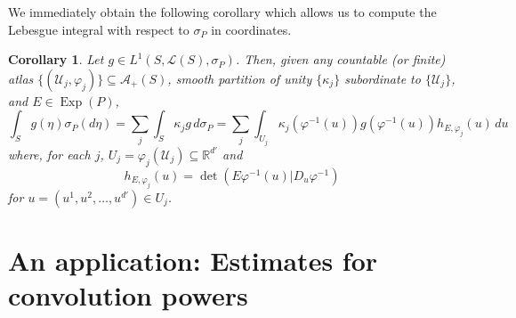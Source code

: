 \documentclass[11pt]{article}
\newtheorem{corollary}[theorem]{Corollary}
\newcommand\Exp{\operatorname{Exp}}
\renewcommand\det{\operatorname{det}}
\begin{document}
\noindent We immediately obtain the following corollary which allows us to compute the Lebesgue integral with respect to $\sigma_P$ in coordinates.
\begin{corollary}\label{cor:IntegralFormula}
Let $g\in L^1(S,\mathcal{L}(S),\sigma_P)$. Then, given any  countable (or finite) atlas $\{(\mathcal{U}_j,\varphi_j)\}\subseteq\mathcal{A}_+(S)$,  smooth partition of unity $\{\kappa_j\}$ subordinate to $\{\mathcal{U}_j\}$, and $E\in\Exp(P)$,
\begin{equation*}
\int_S g(\eta)\sigma_P(d\eta)=\sum_{j}\int_S \kappa_jg\,d\sigma_P=\sum_j\int_{U_j}\kappa_j(\varphi^{-1}(u))g(\varphi^{-1}(u))h_{E,\varphi_j}(u)\,du
\end{equation*}
where, for each $j$, $U_j=\varphi_j(\mathcal{U}_j)\subseteq\mathbb{R}^{d'}$ and
\begin{equation*}
    h_{E,\varphi_j}(u)=\det(E\varphi^{-1}(u)\vert D_u\varphi^{-1})
\end{equation*}
for $u=(u^1,u^2,\dots,u^{d'})\in U_j$. 
\end{corollary}





\section{An application: Estimates for convolution powers}\label{sec:ConvolutionPowers}
\end{document}
